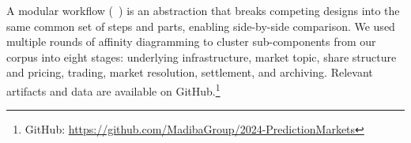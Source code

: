 


A modular workflow (\cf~\cite{ClEsGS21}) is an abstraction that breaks competing designs into the same common set of steps and parts, enabling side-by-side comparison. We used multiple rounds of affinity diagramming to cluster \depm sub-components from our corpus into eight stages: underlying infrastructure, market topic, share structure and pricing, trading, market resolution, settlement, and archiving. Relevant artifacts and data are available on GitHub.\footnote{GitHub: \url{https://github.com/MadibaGroup/2024-PredictionMarkets}}




